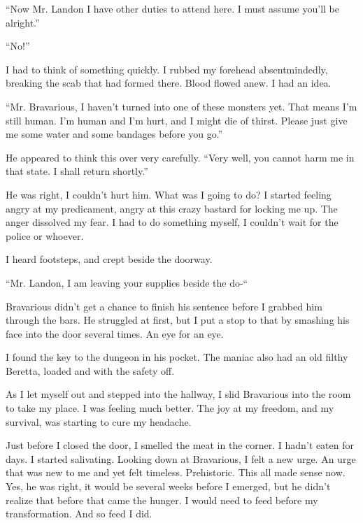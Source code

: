 ``Now Mr. Landon I have other duties to attend here. I must
assume you'll be alright.''



``No!''



I had to think of something quickly. I rubbed my forehead
absentmindedly, breaking the scab that had formed there. Blood
flowed anew. I had an idea.



``Mr. Bravarious, I haven't turned into one of these
monsters yet. That means I'm still human. I'm human and
I'm hurt, and I might die of thirst. Please just give me some
water and some bandages before you go.''



He appeared to think this over very carefully. ``Very well,
you cannot harm me in that state. I shall return
shortly.''



He was right, I couldn't hurt him. What was I going to do? I
started feeling angry at my predicament, angry at this crazy
bastard for locking me up. The anger dissolved my fear. I had to do
something myself, I couldn't wait for the police or
whoever.



I heard footsteps, and crept beside the doorway.



``Mr. Landon, I am leaving your supplies beside the
do-``



Bravarious didn't get a chance to finish his sentence before
I grabbed him through the bars. He struggled at first, but I put a
stop to that by smashing his face into the door several times. An
eye for an eye.



I found the key to the dungeon in his pocket. The maniac also had
an old filthy Beretta, loaded and with the safety off.



As I let myself out and stepped into the hallway, I slid Bravarious
into the room to take my place. I was feeling much better. The joy
at my freedom, and my survival, was starting to cure my
headache.



Just before I closed the door, I smelled the meat in the corner. I
hadn't eaten for days. I started salivating. Looking down at
Bravarious, I felt a new urge. An urge that was new to me and yet
felt timeless. Prehistoric. This all made sense now. Yes, he was
right, it would be several weeks before I emerged, but he
didn't realize that before that came the hunger. I would need
to feed before my transformation. And so feed I did. 

 



%
%
%
%
%
%
%
% 
%
%
%


